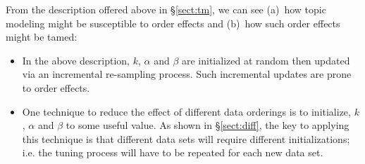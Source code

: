 \documentclass[twocolumn,5p,sort&compress]{elsarticle}
\newcommand{\tion}[1]{{\S}\ref{sect:#1}}
\newcommand{\bi}{\begin{itemize}}
\newcommand{\ei}{\end{itemize}}
\theoremstyle{break}
\begin{document}
From the description offered above in \S\ref{sect:tm},
we can see (a)~how topic modeling might be susceptible to order effects and (b)~how such order
effects might be tamed:
\bi
\item
  In the above description, $k$, $\alpha$ and $\beta$ are initialized at random
then updated via an incremental re-sampling process. Such incremental updates are prone to order effects.
\item
  One technique to reduce the effect of different data orderings is to initialize, $k$, $\alpha$ and $\beta$ to some
  useful value. As shown in \tion{diff},
the key to  applying this technique is that different data sets will require different
  initializations; i.e. the tuning process will have to be repeated for each new data set.
\ei
  






\end{document}
